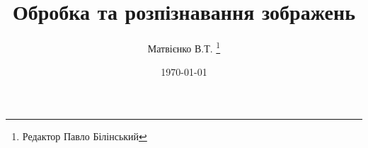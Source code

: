 \documentclass[a4paper,11pt,twoside=semi,numbers=noenddot]{scrbook}
\title{Обробка та розпізнавання зображень}
\author{Матвієнко В.Т. \thanks{Редактор Павло Білінський}}
\date{\today}
\begin{document}
\frontmatter
\maketitle
\tableofcontents

\mainmatter{}


\backmatter{}
\end{document}
